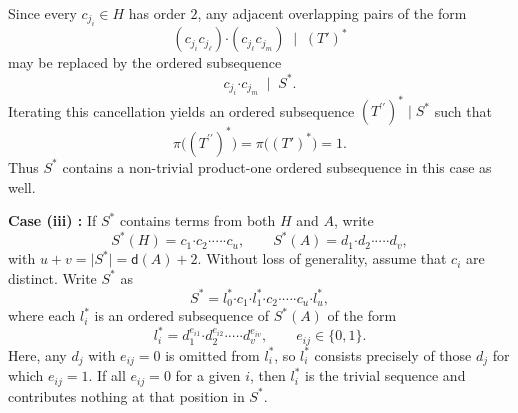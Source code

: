 \documentclass[a4paper,11pt]{article}
\numberwithin{equation}{section}
\newcommand{\bdot}{\boldsymbol{\cdot}}
\newcommand{\no}{\noindent}
\begin{document}
\noindent
Since every $c_{j_i} \in H$ has order $2$, any adjacent overlapping pairs of the form
\[
(c_{j_i}c_{j_\ell}) \bdot (c_{j_\ell}c_{j_m}) \;\mid\; (T')^{\ast}
\]
may be replaced by the ordered subsequence
\[
c_{j_i} \bdot c_{j_m} \;\mid\; S^{\ast}.
\]
Iterating this cancellation yields an ordered subsequence $(T^{\prime\prime})^{\ast} \mid S^{\ast}$ such that 
\[
\pi\bigl((T^{\prime\prime})^{\ast}\bigr)
= \pi\bigl((T')^{\ast}\bigr)
= 1.
\]
Thus $S^{\ast}$ contains a non-trivial product-one ordered subsequence in this case as well.


\smallskip
    
\no \textbf{Case (iii) :} If $S^{\ast}$ contains terms from both $H$ and $A$, write
\[
S^{\ast}(H)=c_1\bdot c_2\bdot\cdots\bdot c_u,\qquad
S^{\ast}(A)=d_1\bdot d_2\bdot\cdots\bdot d_v,
\]
with $u+v=\lvert S^{\ast}\rvert=\mathsf d(A)+2$.  Without loss of generality, assume that $c_i$ are distinct. Write $S^{\ast}$ as
\[
S^{\ast}=l^{\ast}_0\bdot c_1\bdot l^{\ast}_1\bdot c_2\bdot\cdots\bdot c_u\bdot l^{\ast}_u,
\]
where each $l^{\ast}_i$ is an  ordered subsequence of $S^{\ast}(A)$ of the form
\[
l^{\ast}_i=d_1^{e_{i1}}\bdot d_2^{e_{i2}}\bdot\cdots\bdot d_v^{e_{iv}},\qquad e_{ij}\in\{0,1\}.
\] 
Here, any $d_j$ with $e_{ij}=0$ is omitted from $l_i^{\ast}$, so $l_i^{\ast}$ consists precisely of those $d_j$ for which $e_{ij}=1$. If all $e_{ij}=0$ for a given $i$, then $l_i^{\ast}$ is the trivial sequence and contributes nothing at that position in $S^{\ast}$.
\end{document}
